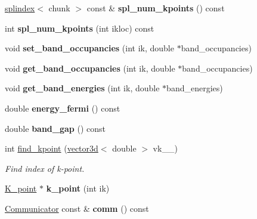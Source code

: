 \begin{DoxyCompactItemize}
\item 
\hypertarget{classsirius_1_1_k__point__set_abe1d3e8dc73b161494ce1ebfad353c81}{}\hyperlink{classsddk_1_1splindex}{splindex}$<$ chunk $>$ const \& {\bfseries spl\+\_\+num\+\_\+kpoints} () const \label{classsirius_1_1_k__point__set_abe1d3e8dc73b161494ce1ebfad353c81}

\item 
\hypertarget{classsirius_1_1_k__point__set_ae0809331d406d6754d7d571e19663452}{}int {\bfseries spl\+\_\+num\+\_\+kpoints} (int ikloc) const \label{classsirius_1_1_k__point__set_ae0809331d406d6754d7d571e19663452}

\item 
\hypertarget{classsirius_1_1_k__point__set_adb77fa34b1f4d28c1ea9d8dc74edbe21}{}void {\bfseries set\+\_\+band\+\_\+occupancies} (int ik, double $\ast$band\+\_\+occupancies)\label{classsirius_1_1_k__point__set_adb77fa34b1f4d28c1ea9d8dc74edbe21}

\item 
\hypertarget{classsirius_1_1_k__point__set_a4ab5d098ef495cd015aaff50190ef266}{}void {\bfseries get\+\_\+band\+\_\+occupancies} (int ik, double $\ast$band\+\_\+occupancies)\label{classsirius_1_1_k__point__set_a4ab5d098ef495cd015aaff50190ef266}

\item 
\hypertarget{classsirius_1_1_k__point__set_a106dbadfb0dc6ff7507177d1fb8ea824}{}void {\bfseries get\+\_\+band\+\_\+energies} (int ik, double $\ast$band\+\_\+energies)\label{classsirius_1_1_k__point__set_a106dbadfb0dc6ff7507177d1fb8ea824}

\item 
\hypertarget{classsirius_1_1_k__point__set_aae3f844a087b3b63d456288152720338}{}double {\bfseries energy\+\_\+fermi} () const \label{classsirius_1_1_k__point__set_aae3f844a087b3b63d456288152720338}

\item 
\hypertarget{classsirius_1_1_k__point__set_a67dd58853c1d99aefae52d8764a73916}{}double {\bfseries band\+\_\+gap} () const \label{classsirius_1_1_k__point__set_a67dd58853c1d99aefae52d8764a73916}

\item 
int \hyperlink{classsirius_1_1_k__point__set_ae1c57ca979c9b9f863446af50ee09cb2}{find\+\_\+kpoint} (\hyperlink{classgeometry3d_1_1vector3d}{vector3d}$<$ double $>$ vk\+\_\+\+\_\+)
\begin{DoxyCompactList}\small\item\em Find index of k-\/point. \end{DoxyCompactList}\item 
\hypertarget{classsirius_1_1_k__point__set_a8b2eeae8d9a3392a09edc9d9bb815c6b}{}\hyperlink{classsirius_1_1_k__point}{K\+\_\+point} $\ast$ {\bfseries k\+\_\+point} (int ik)\label{classsirius_1_1_k__point__set_a8b2eeae8d9a3392a09edc9d9bb815c6b}

\item 
\hypertarget{classsirius_1_1_k__point__set_a704ac03ad43a18ddcad9722c0512a477}{}\hyperlink{classsddk_1_1_communicator}{Communicator} const \& {\bfseries comm} () const \label{classsirius_1_1_k__point__set_a704ac03ad43a18ddcad9722c0512a477}

\end{DoxyCompactItemize}
